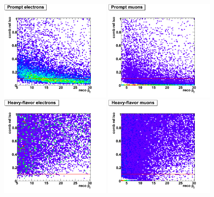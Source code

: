 \documentclass{cmspaper}
\begin{document}
\begin{figure}[htbp]
   \includegraphics[width = 0.49\textwidth]{pictures/recoPt_relIso/combIso_elec_prompt.png}
   \includegraphics[width = 0.49\textwidth]{pictures/recoPt_relIso/combIso_muon_prompt.png} \\
   \includegraphics[width = 0.49\textwidth]{pictures/recoPt_relIso/combIso_elec_nonPrompt.png}
   \includegraphics[width = 0.49\textwidth]{pictures/recoPt_relIso/combIso_muon_nonPrompt.png}\\

\end{figure}
\end{document}
